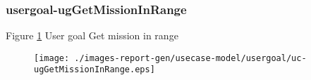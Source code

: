\subsubsection{usergoal-ugGetMissionInRange}

\label{RE-use-case-ugGetMissionInRange}



Figure \ref{fig:lu.uni.lassy.excalibur.g01.specification-RE-UCD-uc-ugGetMissionInRange}
User goal Get mission in range

\begin{figure}[htbp]
\begin{center}

\texttt{[image: ./images-report-gen/usecase-model/usergoal/uc-ugGetMissionInRange.eps]}
\end{center}
\caption[lu.uni.lassy.excalibur.g01.specification Use Case Diagram: uc-ugGetMissionInRange]{}
\label{fig:lu.uni.lassy.excalibur.g01.specification-RE-UCD-uc-ugGetMissionInRange}
\end{figure}
\vspace{0.5cm}
